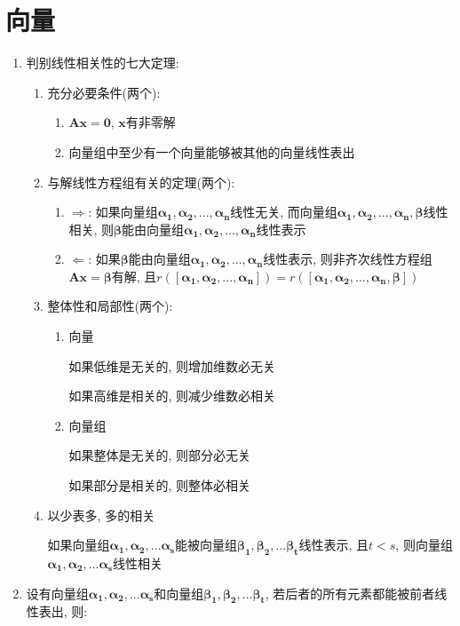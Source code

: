 \chapter{向量}
\begin{enumerate}
\item 判别线性相关性的七大定理:
\begin{enumerate}
\item 充分必要条件(两个):
\begin{enumerate}
\item $\bm{A}\bm{x}=\bm{0}$, $\bm{x}$有非零解
\item 向量组中至少有一个向量能够被其他的向量线性表出
\end{enumerate}
\item 与解线性方程组有关的定理(两个):
\begin{enumerate}
\item $\Rightarrow$: 如果向量组$\bm{{\alpha_{1}}},\bm{{\alpha_{2}}},...,\bm{{\alpha_{n}}}$线性无关, 而向量组$\bm{{\alpha_{1}}},\bm{{\alpha_{2}}},...,\bm{{\alpha_{n}},\bm{\beta}}$线性相关, 则$\bm{\beta}$能由向量组$\bm{{\alpha_{1}}},\bm{{\alpha_{2}}},...,\bm{{\alpha_{n}}}$线性表示
\item $\Leftarrow$: 如果$\bm{\beta}$能由向量组$\bm{{\alpha_{1}}},\bm{{\alpha_{2}}},...,\bm{{\alpha_{n}}}$线性表示, 则非齐次线性方程组$\bm{A}\bm{x}=\bm{\beta}$有解, 且$r([\bm{{\alpha_{1}}},\bm{{\alpha_{2}}},...,\bm{{\alpha_{n}}}])=r([\bm{{\alpha_{1}}},\bm{{\alpha_{2}}},...,\bm{{\alpha_{n}}},\bm{\beta}])$
\end{enumerate}
\item 整体性和局部性(两个):
\begin{enumerate}
\item 向量 \par
如果低维是无关的, 则增加维数必无关\par
如果高维是相关的, 则减少维数必相关
\item 向量组 \par
如果整体是无关的, 则部分必无关 \par
如果部分是相关的, 则整体必相关
\end{enumerate}
\item 以少表多, 多的相关 \par
如果向量组$\bm{\alpha_{1}},\bm{\alpha_{2}},...\bm{\alpha_{s}}$能被向量组$\bm{\beta_{1}},\bm{\beta_{2}},...\bm{\beta_{t}}$线性表示, 且$t<s$, 则向量组$\bm{\alpha_{1}},\bm{\alpha_{2}},...\bm{\alpha_{s}}$线性相关
\end{enumerate}
\item 设有向量组$\bm{\alpha_{1}},\bm{\alpha_{2}},...\bm{\alpha_{s}}$和向量组$\bm{\beta_{1}},\bm{\beta_{2}},...\bm{\beta_{t}}$, 若后者的所有元素都能被前者线性表出, 则:

\end{enumerate}

